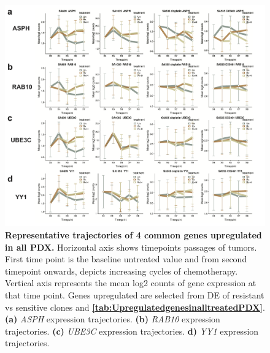 \begin{figure}
\centering
  \includegraphics[width=\textwidth]{Figures/chap5/commongenesfromvolcanoplots.png}
	
\caption[Representative trajectories of 4 common genes upregulated in all PDX]
	{\small
	\textbf{Representative trajectories of 4 common genes upregulated in all PDX.}
	   Horizontal axis shows timepoints passages of tumors. First time point is the baseline untreated value and from second timepoint onwards, depicts increasing cycles of chemotherapy. Vertical axis represents the mean log2 counts of gene expression at that time point. Genes upregulated are selected from \ac{DE} of resistant vs sensitive clones and \textbf{\autoref{tab:UpregulatedgenesinalltreatedPDX}}.
	   \textbf{(a)} \textit{ASPH} expression trajectories.
	    \textbf{(b)} \textit{RAB10} expression trajectories.
	    \textbf{(c)} \textit{UBE3C} expression trajectories.
	     \textbf{d)} \textit{YY1} expression trajectories.
	}
	\label{fig:commongenesfromvolcanoplots}
\end{figure}


